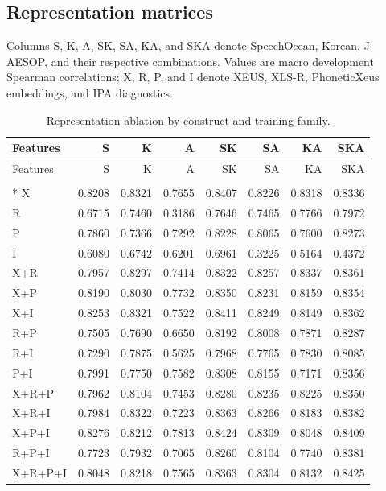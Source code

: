 \documentclass[10pt]{article}
\begin{document}
\subsection{Representation matrices}
Columns S, K, A, SK, SA, KA, and SKA denote SpeechOcean, Korean, J-AESOP, and their respective combinations. Values are macro development Spearman correlations; X, R, P, and I denote XEUS, XLS-R, PhoneticXeus embeddings, and IPA diagnostics.
\begingroup\fontsize{8.5}{10}\selectfont\setlength{\tabcolsep}{5pt}\renewcommand{\arraystretch}{1.0}
\begin{longtable}{@{}lrrrrrrr@{}}
\caption{Representation ablation by construct and training family.}\\
\toprule Features & S & K & A & SK & SA & KA & SKA\\\midrule\endfirsthead
\toprule Features & S & K & A & SK & SA & KA & SKA\\\midrule\endhead
\bottomrule\endfoot
\multicolumn{8}{l}{\textbf{Accuracy}}\\*\midrule
X & 0.8208 & 0.8321 & 0.7655 & 0.8407 & 0.8226 & 0.8318 & 0.8336 \\
R & 0.6715 & 0.7460 & 0.3186 & 0.7646 & 0.7465 & 0.7766 & 0.7972 \\
P & 0.7860 & 0.7366 & 0.7292 & 0.8228 & 0.8065 & 0.7600 & 0.8273 \\
I & 0.6080 & 0.6742 & 0.6201 & 0.6961 & 0.3225 & 0.5164 & 0.4372 \\
X+R & 0.7957 & 0.8297 & 0.7414 & 0.8322 & 0.8257 & 0.8337 & 0.8361 \\
X+P & 0.8190 & 0.8030 & 0.7732 & 0.8350 & 0.8231 & 0.8159 & 0.8354 \\
X+I & 0.8253 & 0.8321 & 0.7522 & 0.8411 & 0.8249 & 0.8149 & 0.8362 \\
R+P & 0.7505 & 0.7690 & 0.6650 & 0.8192 & 0.8008 & 0.7871 & 0.8287 \\
R+I & 0.7290 & 0.7875 & 0.5625 & 0.7968 & 0.7765 & 0.7830 & 0.8085 \\
P+I & 0.7991 & 0.7750 & 0.7582 & 0.8308 & 0.8155 & 0.7171 & 0.8356 \\
X+R+P & 0.7962 & 0.8104 & 0.7453 & 0.8280 & 0.8235 & 0.8225 & 0.8350 \\
X+R+I & 0.7984 & 0.8322 & 0.7223 & 0.8363 & 0.8266 & 0.8183 & 0.8382 \\
X+P+I & 0.8276 & 0.8212 & 0.7813 & 0.8424 & 0.8309 & 0.8048 & 0.8409 \\
R+P+I & 0.7723 & 0.7932 & 0.7065 & 0.8260 & 0.8104 & 0.7740 & 0.8381 \\
X+R+P+I & 0.8048 & 0.8218 & 0.7565 & 0.8363 & 0.8304 & 0.8132 & 0.8425 \\

\end{longtable}
\end{document}
